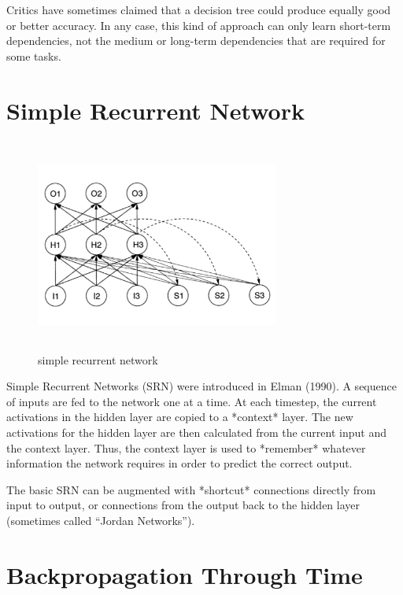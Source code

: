 \documentclass[11pt]{article}
\begin{document}

Critics have sometimes claimed that a decision tree could produce equally good
or better accuracy.
In any case, this kind of approach can only learn short-term dependencies, not
the medium or long-term dependencies that are required for some tasks.

\section{Simple Recurrent Network}\label{sec:simple-recurrent-network}

\begin{figure}[h]
    \centering
    \includegraphics[width=8cm, height=7cm]{../out/images/simple-recurrent-network}
    \caption[simple recurrent network]{simple recurrent network}
    \label{fig: simple recurrent network}
\end{figure}

Simple Recurrent Networks (SRN) were introduced in Elman (1990).
A sequence of inputs are fed to the network one at a time.
At each timestep, the current activations in the hidden layer are copied to a
*context* layer.
The new activations for the hidden layer are then calculated from the current
input and the context layer.
Thus, the context layer is used to *remember* whatever information the network
requires in order to predict the correct output.

The basic SRN can be augmented with *shortcut* connections directly from input
to output, or connections from the output back to the hidden layer (sometimes
called “Jordan Networks”).

\section{Backpropagation Through Time}\label{sec:backpropagation-through-time}
\end{document}
